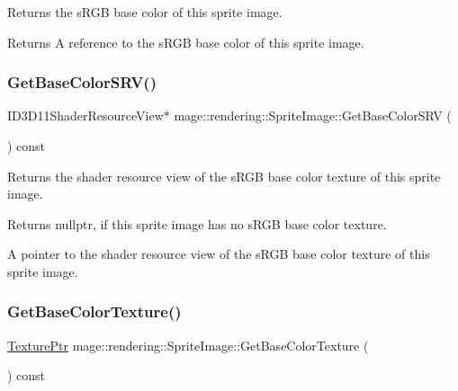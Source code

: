Returns the s\+R\+GB base color of this sprite image.

\begin{DoxyReturn}{Returns}
A reference to the s\+R\+GB base color of this sprite image. 
\end{DoxyReturn}
\hypertarget{classmage_1_1rendering_1_1_sprite_image_a7dceee8dfe1432948a77f0563d6b70a3}{}\label{classmage_1_1rendering_1_1_sprite_image_a7dceee8dfe1432948a77f0563d6b70a3} 
\subsubsection{\texorpdfstring{Get\+Base\+Color\+S\+R\+V()}{GetBaseColorSRV()}}
{\footnotesize\ttfamily I\+D3\+D11\+Shader\+Resource\+View$\ast$ mage\+::rendering\+::\+Sprite\+Image\+::\+Get\+Base\+Color\+S\+RV (\begin{DoxyParamCaption}{ }\end{DoxyParamCaption}) const\hspace{0.3cm}{\ttfamily [noexcept]}}

Returns the shader resource view of the s\+R\+GB base color texture of this sprite image.

\begin{DoxyReturn}{Returns}
{\ttfamily nullptr}, if this sprite image has no s\+R\+GB base color texture. 

A pointer to the shader resource view of the s\+R\+GB base color texture of this sprite image. 
\end{DoxyReturn}
\hypertarget{classmage_1_1rendering_1_1_sprite_image_ab5b257c4df82dc72223affe8b32c0b70}{}\label{classmage_1_1rendering_1_1_sprite_image_ab5b257c4df82dc72223affe8b32c0b70} 
\subsubsection{\texorpdfstring{Get\+Base\+Color\+Texture()}{GetBaseColorTexture()}}
{\footnotesize\ttfamily \hyperlink{namespacemage_1_1rendering_a6f3ae54f825328465b0cdde0f0de4a36}{Texture\+Ptr} mage\+::rendering\+::\+Sprite\+Image\+::\+Get\+Base\+Color\+Texture (\begin{DoxyParamCaption}{ }\end{DoxyParamCaption}) const\hspace{0.3cm}{\ttfamily [noexcept]}}

